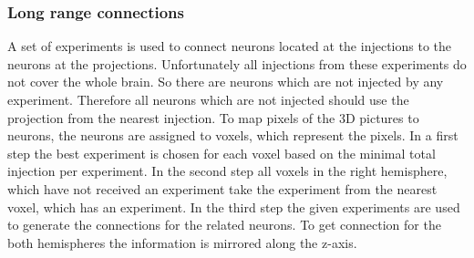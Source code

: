 \documentclass[a4paper]{article}
\begin{document}
\subsubsection{Long range connections}
A set of experiments is used to connect neurons located at the injections
to the neurons at the projections. Unfortunately all injections from these experiments do not
cover the whole brain. So there are neurons which are not injected
by any experiment. Therefore all neurons which are not injected should use the projection
from the nearest injection. To map pixels of the 3D pictures to neurons, the neurons are assigned to voxels, which represent the pixels. In a first step the best experiment is chosen for each voxel based on the minimal total injection per experiment. In the second step all voxels in the right hemisphere, which have not received an experiment take the experiment from the nearest voxel, which has an experiment. In the third step the given experiments are used to generate the connections for the related neurons. To get connection for the both hemispheres the information is mirrored along the z-axis.
\end{document}
